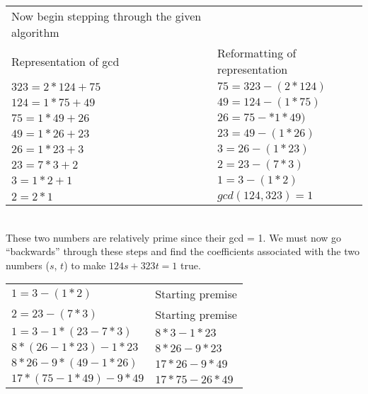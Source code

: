 \documentclass[11pt]{article}
\begin{document}
\begin{enumerate}
\begin{enumerate}[(a)]
\begin{tabular}{ll}
				Now begin stepping through the given algorithm \\

				Representation of gcd & Reformatting of representation \\

				\hline 

				$323 = 2 * 124 + 75$ & $75 = 323 - (2 * 124)$\\

				$124 = 1 * 75 +49$ & $49 = 124 - (1 * 75)$\\

				$75 = 1 * 49 + 26$ & $26 = 75 - *1*49)$\\

				$49 = 1 * 26 + 23$ & $23 = 49 - (1 * 26)$\\

				$26 = 1 * 23 + 3$ & $3 = 26 - (1 * 23)$\\

				$23 = 7 * 3 + 2$ & $2 = 23 - (7 * 3)$\\

				$3 = 1 * 2 + 1$ & $1 = 3 - (1 * 2)$\\

				$2 = 2 * 1$ & $gcd(124, 323) = 1$ \\

			\end{tabular} \\

			These two numbers are relatively prime since their gcd = 1. We must now go ``backwards''
			through these steps and find the coefficients associated with the two numbers ($s$, $t$)
			to make $124s + 323t = 1$ true.

			\begin{tabular}{ll}
				$1 = 3 - (1 * 2)$ & Starting premise\\

				$2 = 23 - (7 * 3)$ & Starting premise\\

				$1 = 3 - 1 * (23 - 7 * 3)$ & $8 * 3 - 1 * 23$ \\

				$8 * (26 - 1 * 23) - 1 * 23$ & $8 * 26 - 9 * 23$ \\

				$8 * 26 - 9 * (49 - 1 * 26)$ & $17 * 26 - 9 * 49$ \\

				$17 * (75 - 1 * 49) - 9 * 49$ & $17 * 75 - 26 * 49$ \\


\end{tabular}
\end{enumerate}
\end{enumerate}
\end{document}
